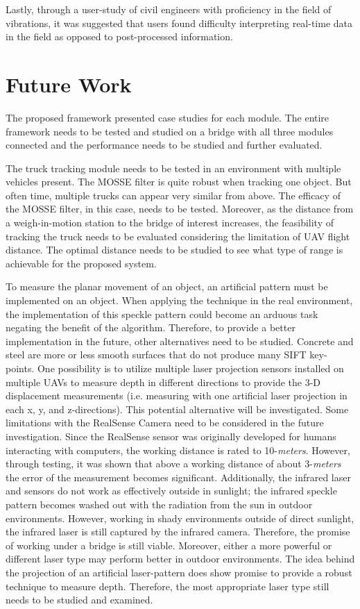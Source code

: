 \documentclass{sigchi}
\begin{document}
Lastly, through a user-study of civil engineers with proficiency in the field of vibrations, it was suggested that users found difficulty interpreting real-time data in the field as opposed to post-processed information.

\section{Future Work}

The proposed framework presented case studies for each module. The entire framework needs to be tested and studied on a bridge with all three modules connected and the performance needs to be studied and further evaluated.

The truck tracking module needs to be tested in an environment with multiple vehicles present. The MOSSE filter is quite robust when tracking one object. But often time, multiple trucks can appear very similar from above. The efficacy of the MOSSE filter, in this case, needs to be tested. Moreover, as the distance from a weigh-in-motion station to the bridge of interest increases, the feasibility of tracking the truck needs to be evaluated considering the limitation of UAV flight distance. The optimal distance needs to be studied to see what type of range is achievable for the proposed system. 

To measure the planar movement of an object, an artificial pattern must be implemented on an object. When applying the technique in the real environment, the implementation of this speckle pattern could become an arduous task negating the benefit of the algorithm. Therefore, to provide a better implementation in the future, other alternatives need to be studied. Concrete and steel are more or less smooth surfaces that do not produce many SIFT key-points. One possibility is to utilize multiple laser projection sensors installed on multiple UAVs to measure depth in different directions to provide the 3-D displacement measurements (i.e. measuring with one artificial laser projection in each x, y, and z-directions). This potential alternative will be investigated. Some limitations with the RealSense Camera need to be considered in the future investigation. Since the RealSense sensor was originally developed for humans interacting with computers, the working distance is rated to 10-\textit{meters}. However, through testing, it was shown that above a working distance of about 3-\textit{meters} the error of the measurement becomes significant. Additionally, the infrared laser and sensors do not work as effectively outside in sunlight; the infrared speckle pattern becomes washed out with the radiation from the sun in outdoor environments. However, working in shady environments outside of direct sunlight, the infrared laser is still captured by the infrared camera. Therefore, the promise of working under a bridge is still viable. Moreover, either a more powerful or different laser type may perform better in outdoor environments. The idea behind the projection of an artificial laser-pattern does show promise to provide a robust technique to measure depth. Therefore, the most appropriate laser type still needs to be studied and examined.
\end{document}

